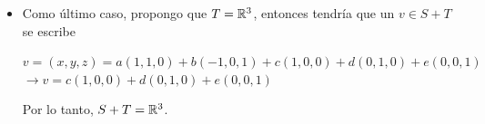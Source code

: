 \begin{enumerate}
\begin{mdframed}[style=s]
\begin{itemize}
                    \item Como último caso, propongo que $T=\mathbb{R}^3$, entonces tendría que un $v\in S+T$ se escribe
                        \begin{center}
                            $v=(x,y,z)=a(1,1,0)+b(-1,0,1)+c(1,0,0)+d(0,1,0)+e(0,0,1)$\\
                            $\to v=c(1,0,0)+d(0,1,0)+e(0,0,1)$
                        \end{center}
                        Por lo tanto, $S+T=\mathbb{R}^3$.
                \end{itemize}
                
            \end{mdframed}
    \end{enumerate}